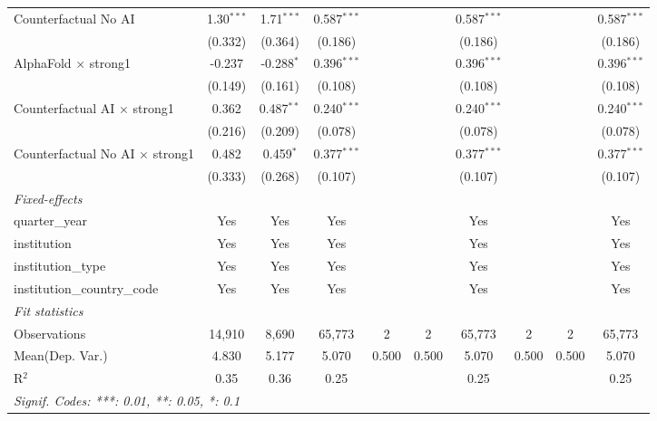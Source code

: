 \begin{tabular}{lccccccccc}
   Counterfactual No AI                   & 1.30$^{***}$ & 1.71$^{***}$ & 0.587$^{***}$ &     &     & 0.587$^{***}$ &     &     & 0.587$^{***}$\\   
                                          & (0.332)      & (0.364)      & (0.186)       &     &     & (0.186)       &     &     & (0.186)\\   
   AlphaFold $\times$ strong1             & -0.237       & -0.288$^{*}$ & 0.396$^{***}$ &     &     & 0.396$^{***}$ &     &     & 0.396$^{***}$\\   
                                          & (0.149)      & (0.161)      & (0.108)       &     &     & (0.108)       &     &     & (0.108)\\   
   Counterfactual AI $\times$ strong1     & 0.362        & 0.487$^{**}$ & 0.240$^{***}$ &     &     & 0.240$^{***}$ &     &     & 0.240$^{***}$\\   
                                          & (0.216)      & (0.209)      & (0.078)       &     &     & (0.078)       &     &     & (0.078)\\   
   Counterfactual No AI $\times$ strong1  & 0.482        & 0.459$^{*}$  & 0.377$^{***}$ &     &     & 0.377$^{***}$ &     &     & 0.377$^{***}$\\   
                                          & (0.333)      & (0.268)      & (0.107)       &     &     & (0.107)       &     &     & (0.107)\\   
   \midrule
   \emph{Fixed-effects}\\
   quarter\_year                          & Yes          & Yes          & Yes           &     &     & Yes           &     &     & Yes\\  
   institution                            & Yes          & Yes          & Yes           &     &     & Yes           &     &     & Yes\\  
   institution\_type                      & Yes          & Yes          & Yes           &     &     & Yes           &     &     & Yes\\  
   institution\_country\_code             & Yes          & Yes          & Yes           &     &     & Yes           &     &     & Yes\\  
   \midrule
   \emph{Fit statistics}\\
   Observations                           & 14,910       & 8,690        & 65,773        & 2   & 2   & 65,773        & 2   & 2   & 65,773\\  
Mean(Dep. Var.) & 4.830 & 5.177 & 5.070 & 0.500 & 0.500 & 5.070 & 0.500 & 0.500 & 5.070 \\
   R$^2$                                  & 0.35         & 0.36         & 0.25          &     &     & 0.25          &     &     & 0.25\\  
   \midrule \midrule
   \multicolumn{10}{l}{\emph{Signif. Codes: ***: 0.01, **: 0.05, *: 0.1}}\\
\end{tabular}
\par\endgroup
